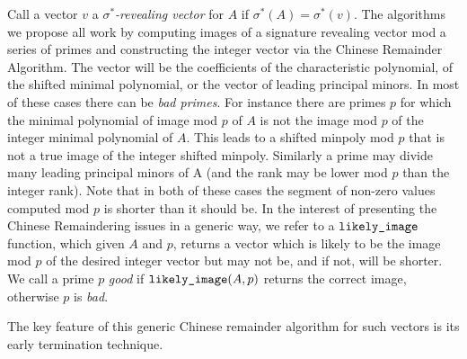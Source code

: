 \documentclass{acm_proc_article-sp}
\newcommand{\reveal}{\ensuremath{\mbox{\tt likely\_image}}}
\newcommand{\signature}{\ensuremath{\sigma^{*}}}
\begin{document}
%
Call a vector $v$
a {\em \signature-revealing vector} for $A$ 
if $\signature(A) = \signature(v)$.
The algorithms we
propose all work by computing images of a signature revealing vector 
mod a series of primes
and constructing the integer vector via the Chinese Remainder Algorithm.
The vector will be the coefficients of the characteristic polynomial, of
the shifted minimal polynomial, or the vector of leading principal minors.
In most of these cases there can be {\em bad primes}.  For instance 
there are primes $p$ for which the minimal polynomial of image mod $p$ of $A$ 
is not the image mod $p$ of the integer minimal polynomial of $A$.  This 
leads to a shifted minpoly mod $p$ that is not a true image of the integer
shifted minpoly. Similarly
a prime may divide many leading principal minors of A (and the rank may be
lower mod $p$ than the integer rank).  Note that in both of these cases
the segment of non-zero values computed mod $p$ is shorter than it should be.
In the interest of presenting the Chinese Remaindering issues in a generic
way, we refer to a $\reveal$ function, which given $A$ and $p$, returns
a vector which is likely to be the image mod $p$ of the desired integer vector
but may not be, and if not, will be shorter.
We call a prime $p$ {\em good} if $\reveal(A, p)$ returns the correct image,
otherwise $p$ is {\em bad}.  

The key feature of this generic Chinese remainder algorithm for such vectors 
is its early termination technique.
\end{document}
